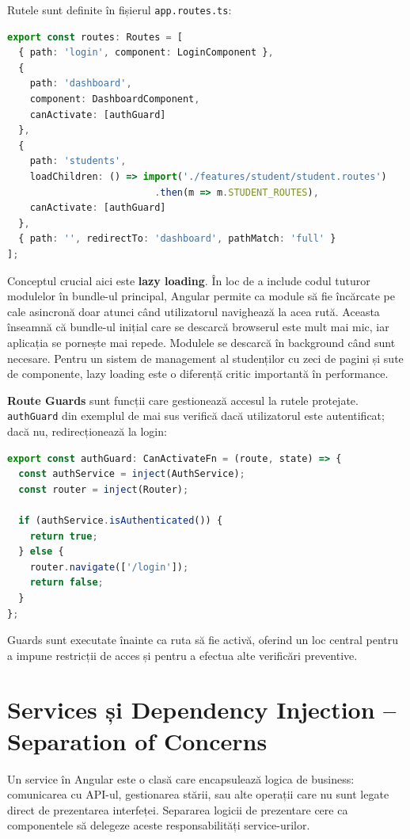 Rutele sunt definite în fișierul \texttt{app.routes.ts}:

\begin{lstlisting}[language=TypeScript]
export const routes: Routes = [
  { path: 'login', component: LoginComponent },
  {
    path: 'dashboard',
    component: DashboardComponent,
    canActivate: [authGuard]
  },
  {
    path: 'students',
    loadChildren: () => import('./features/student/student.routes')
                          .then(m => m.STUDENT_ROUTES),
    canActivate: [authGuard]
  },
  { path: '', redirectTo: 'dashboard', pathMatch: 'full' }
];
\end{lstlisting}

Conceptul crucial aici este \textbf{lazy loading}. În loc de a include codul tuturor modulelor în bundle-ul principal, Angular permite ca module să fie încărcate pe cale asincronă doar atunci când utilizatorul navighează la acea rută. Aceasta înseamnă că bundle-ul inițial care se descarcă browserul este mult mai mic, iar aplicația se pornește mai repede. Modulele se descarcă în background când sunt necesare. Pentru un sistem de management al studenților cu zeci de pagini și sute de componente, lazy loading este o diferență critic importantă în performance.

\textbf{Route Guards} sunt funcții care gestionează accesul la rutele protejate. \texttt{authGuard} din exemplul de mai sus verifică dacă utilizatorul este autentificat; dacă nu, redirecționează la login:

\begin{lstlisting}[language=TypeScript]
export const authGuard: CanActivateFn = (route, state) => {
  const authService = inject(AuthService);
  const router = inject(Router);

  if (authService.isAuthenticated()) {
    return true;
  } else {
    router.navigate(['/login']);
    return false;
  }
};
\end{lstlisting}

Guards sunt executate înainte ca ruta să fie activă, oferind un loc central pentru a impune restricții de acces și pentru a efectua alte verificări preventive.

\section{Services și Dependency Injection – Separation of Concerns}

Un service în Angular este o clasă care encapsulează logica de business: comunicarea cu API-ul, gestionarea stării, sau alte operații care nu sunt legate direct de prezentarea interfeței. Separarea logicii de prezentare cere ca componentele să delegeze aceste responsabilități service-urilor.

